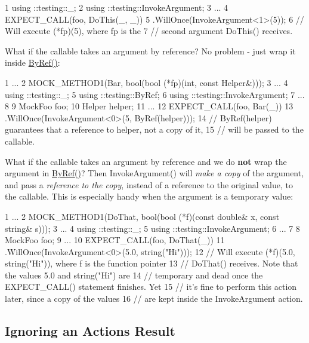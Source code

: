 \begin{DoxyCode}
1 using ::testing::\_;
2 using ::testing::InvokeArgument;
3 ...
4   EXPECT\_CALL(foo, DoThis(\_, \_))
5       .WillOnce(InvokeArgument<1>(5));
6   // Will execute (*fp)(5), where fp is the
7   // second argument DoThis() receives.
\end{DoxyCode}


What if the callable takes an argument by reference? No problem -\/ just wrap it inside {\ttfamily \hyperlink{namespacetesting_aaee6d42dcd69de6e7a1459c5c71222c3}{By\+Ref()}}\+:


\begin{DoxyCode}
1 ...
2   MOCK\_METHOD1(Bar, bool(bool (*fp)(int, const Helper&)));
3 ...
4 using ::testing::\_;
5 using ::testing::ByRef;
6 using ::testing::InvokeArgument;
7 ...
8 
9   MockFoo foo;
10   Helper helper;
11   ...
12   EXPECT\_CALL(foo, Bar(\_))
13       .WillOnce(InvokeArgument<0>(5, ByRef(helper)));
14   // ByRef(helper) guarantees that a reference to helper, not a copy of it,
15   // will be passed to the callable.
\end{DoxyCode}


What if the callable takes an argument by reference and we do {\bfseries not} wrap the argument in {\ttfamily \hyperlink{namespacetesting_aaee6d42dcd69de6e7a1459c5c71222c3}{By\+Ref()}}? Then {\ttfamily Invoke\+Argument()} will {\itshape make a copy} of the argument, and pass a {\itshape reference to the copy}, instead of a reference to the original value, to the callable. This is especially handy when the argument is a temporary value\+:


\begin{DoxyCode}
1 ...
2   MOCK\_METHOD1(DoThat, bool(bool (*f)(const double& x, const string& s)));
3 ...
4 using ::testing::\_;
5 using ::testing::InvokeArgument;
6 ...
7 
8   MockFoo foo;
9   ...
10   EXPECT\_CALL(foo, DoThat(\_))
11       .WillOnce(InvokeArgument<0>(5.0, string("Hi")));
12   // Will execute (*f)(5.0, string("Hi")), where f is the function pointer
13   // DoThat() receives.  Note that the values 5.0 and string("Hi") are
14   // temporary and dead once the EXPECT\_CALL() statement finishes.  Yet
15   // it's fine to perform this action later, since a copy of the values
16   // are kept inside the InvokeArgument action.
\end{DoxyCode}


\subsection*{Ignoring an Action\textquotesingle{}s Result}

